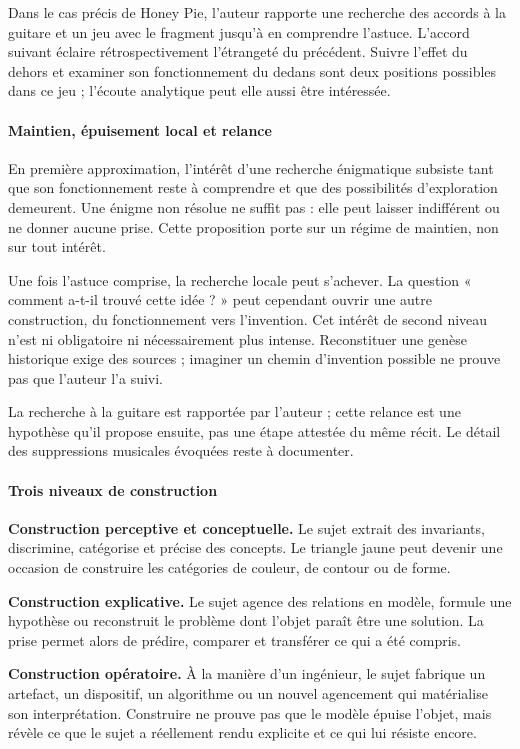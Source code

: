 \documentclass[10pt,a4paper]{article}
\begin{document}
Dans le cas précis de Honey Pie, l'auteur rapporte une recherche des accords à la guitare et un jeu avec le fragment jusqu'à en comprendre l'astuce. L'accord suivant éclaire rétrospectivement l'étrangeté du précédent. Suivre l'effet du dehors et examiner son fonctionnement du dedans sont deux positions possibles dans ce jeu ; l'écoute analytique peut elle aussi être intéressée.

\paragraph{Maintien, épuisement local et relance}
En première approximation, l'intérêt d'une recherche énigmatique subsiste tant que son fonctionnement reste à comprendre et que des possibilités d'exploration demeurent. Une énigme non résolue ne suffit pas : elle peut laisser indifférent ou ne donner aucune prise. Cette proposition porte sur un régime de maintien, non sur tout intérêt.

Une fois l'astuce comprise, la recherche locale peut s'achever. La question « comment a-t-il trouvé cette idée ? » peut cependant ouvrir une autre construction, du fonctionnement vers l'invention. Cet intérêt de second niveau n'est ni obligatoire ni nécessairement plus intense. Reconstituer une genèse historique exige des sources ; imaginer un chemin d'invention possible ne prouve pas que l'auteur l'a suivi.

La recherche à la guitare est rapportée par l'auteur ; cette relance est une hypothèse qu'il propose ensuite, pas une étape attestée du même récit. Le détail des suppressions musicales évoquées reste à documenter.

\paragraph{Trois niveaux de construction}
\textbf{Construction perceptive et conceptuelle.} Le sujet extrait des invariants, discrimine, catégorise et précise des concepts. Le triangle jaune peut devenir une occasion de construire les catégories de couleur, de contour ou de forme.

\textbf{Construction explicative.} Le sujet agence des relations en modèle, formule une hypothèse ou reconstruit le problème dont l'objet paraît être une solution. La prise permet alors de prédire, comparer et transférer ce qui a été compris.

\textbf{Construction opératoire.} À la manière d'un ingénieur, le sujet fabrique un artefact, un dispositif, un algorithme ou un nouvel agencement qui matérialise son interprétation. Construire ne prouve pas que le modèle épuise l'objet, mais révèle ce que le sujet a réellement rendu explicite et ce qui lui résiste encore.
\end{document}
